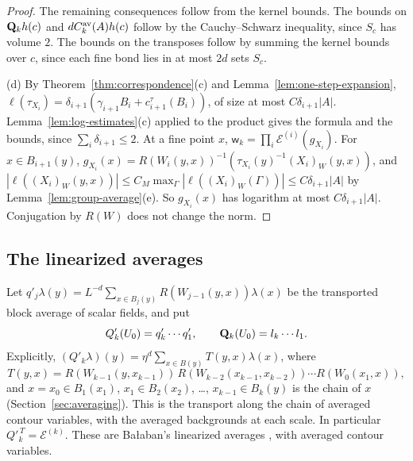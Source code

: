 \begin{proof}
The remaining consequences follow from the kernel bounds. The bounds on $\mathbf Q_kh(c)$ and $dC^{\rm av}_k(A)h(c)$ follow by the Cauchy--Schwarz inequality, since $S_c$ has volume $2$. The bounds on the transposes follow by summing the kernel bounds over $c$, since each fine bond lies in at most $2d$ sets $S_c$.

(d) By Theorem~\ref{thm:correspondence}(c) and Lemma~\ref{lem:one-step-expansion}, $\ell(\tau_{X_i})=\delta_{i+1}(\gamma_{i+1}B_i+c^\tau_{i+1}(B_i))$, of size at most $C\delta_{i+1}|A|$. Lemma~\ref{lem:log-estimates}(c) applied to the product gives the formula and the bounds, since $\sum_i\delta_{i+1}\le2$. At a fine point $x$, $\mathsf w_k=\prod_i\mathcal E^{(i)}(g_{X_i})$. For $x\in B_{i+1}(y)$, $g_{X_i}(x)=R(W_i(y,x))^{-1}(\tau_{X_i}(y)^{-1}(X_i)_W(y,x))$, and $|\ell((X_i)_W(y,x))|\le C_M\max_\Gamma|\ell((X_i)_W(\Gamma))|\le C\delta_{i+1}|A|$ by Lemma~\ref{lem:group-average}(e). So $g_{X_i}(x)$ has logarithm at most $C\delta_{i+1}|A|$. Conjugation by $R(W)$ does not change the norm.
\end{proof}

\subsection{The linearized averages}\label{ss:22.6}

Let $q'_j\lambda(y)=L^{-d}\sum_{x\in B_j(y)}R(W_{j-1}(y,x))\lambda(x)$ be the transported block average of scalar fields, and put
\[
Q'_k(U_0)=q'_k\cdots q'_1,\qquad\mathbf Q_k(U_0)=l_k\cdots l_1 .
\]
Explicitly, $(Q'_k\lambda)(y)=\eta^d\sum_{x\in B(y)}T(y,x)\lambda(x)$, where
\[
T(y,x)=R(W_{k-1}(y,x_{k-1}))\,R(W_{k-2}(x_{k-1},x_{k-2}))\cdots R(W_0(x_1,x)),
\]
and $x=x_0\in B_1(x_1)$, $x_1\in B_2(x_2)$, \dots, $x_{k-1}\in B_k(y)$ is the chain of $x$ (Section~\ref{sec:averaging}). This is the transport along the chain of averaged contour variables, with the averaged backgrounds at each scale. In particular $Q'^{\,T}_k=\mathcal E^{(k)}$. These are Ba\l aban's linearized averages \cite[(3.15)--(3.19)]{BalBackground}, with averaged contour variables.

